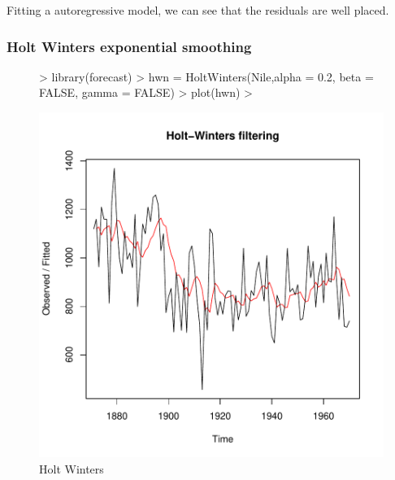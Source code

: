 \documentclass[11pt, a4paper]{article} %
\begin{document}
\noindent Fitting a autoregressive model, we can see that the residuals are well placed.

\subsubsection{Holt Winters exponential smoothing}

\begin{figure}
\centering
\begin{Schunk}
\begin{Sinput}
> library(forecast)
> hwn = HoltWinters(Nile,alpha = 0.2, beta = FALSE, gamma = FALSE)
> plot(hwn)
> 
\end{Sinput}
\end{Schunk}
\includegraphics{alles-039}
\caption{Holt Winters}
\end{figure}
\end{document}

